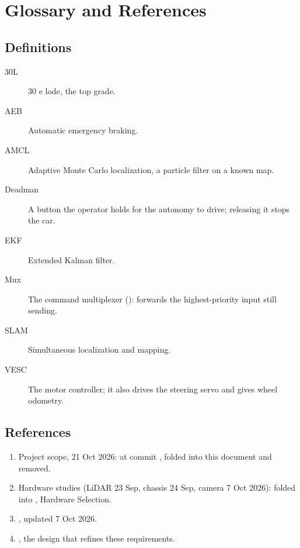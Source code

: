 \documentclass[11pt,a4paper]{article}
\begin{document}
\section{Glossary and References}
\subsection{Definitions}
\begin{description}
  \item[30L] 30 e lode, the top grade.
  \item[AEB] Automatic emergency braking.
  \item[AMCL] Adaptive Monte Carlo localization, a particle filter on a known map.
  \item[Deadman] A button the operator holds for the autonomy to drive; releasing it stops the car.
  \item[EKF] Extended Kalman filter.
  \item[Mux] The command multiplexer (): forwards the highest-priority input still sending.
  \item[SLAM] Simultaneous localization and mapping.
  \item[VESC] The motor controller; it also drives the steering servo and gives wheel odometry.
\end{description}

\subsection{References}
\begin{enumerate}
  \item Project scope, 21 Oct 2026:  at commit , folded into this document and removed.
  \item Hardware studies (LiDAR 23 Sep, chassis 24 Sep, camera 7 Oct 2026): folded into , Hardware Selection.
  \item {}, updated 7 Oct 2026.
  \item {}, the design that refines these requirements.
\end{enumerate}
\end{document}

